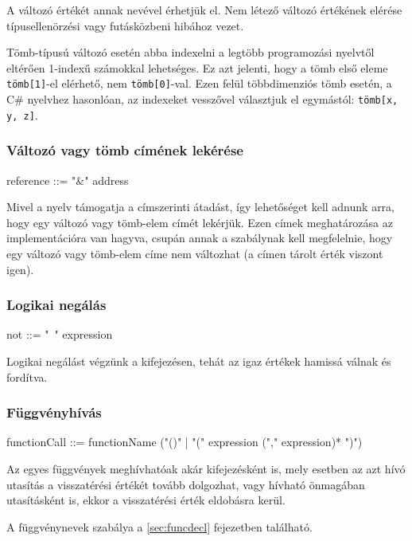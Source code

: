 A változó értékét annak nevével érhetjük el. Nem létező változó értékének elérése típusellenörzési vagy futásközbeni hibához vezet.

Tömb-típusú változó esetén abba indexelni a legtöbb programozási nyelvtől eltérően 1-indexű számokkal lehetséges. Ez azt jelenti, hogy a tömb első eleme \texttt{tömb[1]}-el elérhető, nem \texttt{tömb[0]}-val. Ezen felül többdimenziós tömb esetén, a C\# nyelvhez hasonlóan, az indexeket vesszővel választjuk el egymástól: \texttt{tömb[x, y, z]}.

\subsubsection{Változó vagy tömb címének lekérése}

\begin{ebnf}
reference ::= "&" address
\end{ebnf}

Mivel a nyelv támogatja a címszerinti átadást, így lehetőséget kell adnunk arra, hogy egy változó vagy tömb-elem címét lekérjük. Ezen címek meghatározása az implementációra van hagyva, csupán annak a szabálynak kell megfelelnie, hogy egy változó vagy tömb-elem címe nem változhat (a címen tárolt érték viszont igen).

\subsubsection{Logikai negálás}

\begin{ebnf}
not ::= "~" expression
\end{ebnf}

Logikai negálást végzünk a kifejezésen, tehát az igaz értékek hamissá válnak és fordítva.

\subsubsection{Függvényhívás}

\begin{ebnf}
functionCall ::= functionName ("()" | "(" expression ("," expression)* ")")
\end{ebnf}

Az egyes függvények meghívhatóak akár kifejezésként is, mely esetben az azt hívó utasítás a visszatérési értékét tovább dolgozhat, vagy hívható önmagában utasításként is, ekkor a visszatérési érték eldobásra kerül.

A függvénynevek szabálya a \ref{sec:funcdecl} fejezetben található.

